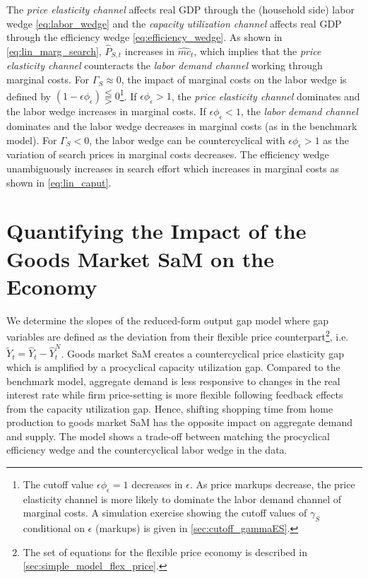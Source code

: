 \documentclass[12pt,3p,authoryear,review]{elsarticle}
\begin{document}
The \emph{price elasticity channel} affects real GDP through the (household side) labor wedge \eqref{eq:labor_wedge} and the \emph{capacity utilization channel} affects real GDP through the efficiency wedge \eqref{eq:efficiency_wedge}. As shown in \eqref{eq:lin_marg_search}, $\hat{P}_{S,t}$ increases in $\hat{mc}_t$, which implies that the \emph{price elasticity channel} counteracts the \emph{labor demand channel} working through marginal costs. For $\Gamma_S \approx 0$, the impact of marginal costs on the labor wedge is defined by $(1-\epsilon\phi_\epsilon) \lesseqqgtr 0$\footnote{The cutoff value $\epsilon\phi_\epsilon = 1$ decreases in $\epsilon$. As price markups decrease, the price elasticity channel is more likely to dominate the labor demand channel of marginal costs. A simulation exercise showing the cutoff values of $\gamma_S$ conditional on $\epsilon$ (markups) is given in \ref{sec:cutoff_gammaES}.}. If $\epsilon \phi_\epsilon > 1$, the \emph{price elasticity channel} dominates and the labor wedge increases in marginal costs. If $\epsilon \phi_\epsilon < 1$, the \emph{labor demand channel} dominates and the labor wedge decreases in marginal costs (as in the benchmark model). For $\Gamma_S < 0$, the labor wedge can be countercyclical with $\epsilon\phi_\epsilon > 1$ as the variation of search prices in marginal costs decreases. The efficiency wedge unambiguously increases in search effort which increases in marginal costs as shown in \eqref{eq:lin_caput}.%
\section{Quantifying the Impact of the Goods Market SaM on the Economy}\label{sec:analysis}%
We determine the slopes of the reduced-form output gap model where gap variables are defined as the deviation from their flexible price counterpart\footnote{The set of equations for the flexible price economy is described in \ref{sec:simple_model_flex_price}.}, i.e. $\tilde{Y}_{t} = \hat{Y}_{t} - \hat{Y}^N_{t}$. Goods market SaM creates a countercyclical price elasticity gap which is amplified by a procyclical capacity utilization gap. Compared to the benchmark model, aggregate demand is less responsive to changes in the real interest rate while firm price-setting is more flexible following feedback effects from the capacity utilization gap. Hence, shifting shopping time from home production \citep{lesterHomeProductionSticky2014} to goods market SaM has the opposite impact on aggregate demand and supply. The model shows a trade-off between matching the procyclical efficiency wedge and the countercyclical labor wedge in the data.%
\end{document}
